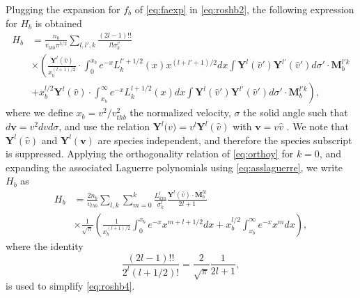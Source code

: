 Plugging the expansion for $f_b$ of \cref{eq:faexp} in \cref{eq:roshb2}, the following expression for $H_b$ is obtained
%
\begin{align}
    H_b &= \frac{n_b}{v_{thb} \pi^{3/2}} \sum_{l,l',k} \frac{(2l-1)!!}{l!\sigma_k^{l'}}\nonumber\\
    &\times\left(\frac{\mathbf Y^{l}(\hat v)}{x_b^{(l+1)/2}} \cdot \int_{0}^{x_b} e^{-x} L_k^{l'+1/2}(x) x^{(l+l'+1)/2} dx \int \mathbf Y^{l}(\hat v')\mathbf Y^{l'}(\hat v') d\sigma' \cdot \mathbf M_b^{l'k}\right.\nonumber\\
    &\left.+x_b^{l/2} \mathbf Y^{l}(\hat v) \cdot \int_{x_b}^{\infty} e^{-x}L_k^{l+1/2}(x) dx \int \mathbf Y^{l}(\hat v')\mathbf Y^{l'}(\hat v') d\sigma' \cdot \mathbf M_b^{l'k}\right),
\label{eq:roshb3}
\end{align}
%
where we define $x_b=v^2/v_{thb}^2$ the normalized velocity, $\sigma$ the solid angle such that $d \mathbf v = v^2 dv d\sigma$, and use the relation $\mathbf Y^{l} \mathbf (v) = v^l \mathbf Y^l(\hat v)$ with $\mathbf v = v \hat v$ \citep{Weinert1980}.
%
We note that $\mathbf Y^l(\hat v)$ and $\mathbf Y^l(\mathbf v)$ are species independent, and therefore the species subscript is suppressed.
%
Applying the orthogonality relation of \cref{eq:orthoy} for $k=0$, and expanding the associated Laguerre polynomials using \cref{eq:asslaguerre}, we write $H_b$ as
%
\begin{align}
    H_b &= \frac{2n_b}{v_{thb}} \sum_{l,k} \sum_{m=0}^k \frac{L_{km}^{l}}{\sigma_k^l}\frac{\mathbf Y^{l}(\hat v) \cdot \mathbf M_b^{lk}}{2l+1} \nonumber\\
    &\times\frac{1}{\sqrt{\pi}}\left(\frac{1}{x_b^{(l+1)/2}} \int_{0}^{x_b} e^{-x} x^{m+l+1/2} dx+x_b^{l/2} \int_{x_b}^{\infty} e^{-x}x^m dx\right),
\label{eq:roshb4}
\end{align}
%
where the identity
%
\begin{equation}
    \frac{(2l-1)!!}{2^l (l+1/2)!}=\frac{2}{\sqrt{\pi}}\frac{1}{2l+1},
\end{equation}
%
is used to simplify \cref{eq:roshb4}.

